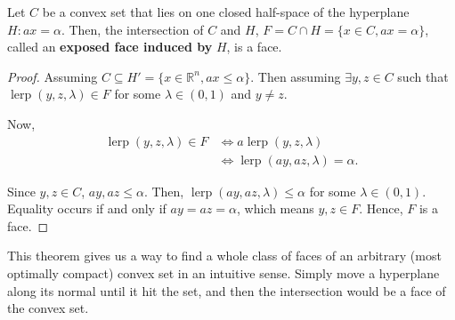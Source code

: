 \begin{theorem}
\label{thr:Exposed faces}
  Let \( C \) be a convex set that lies on one closed half-space of the
  hyperplane \( H: ax = \alpha \). Then, the intersection of \( C \) and \( H
  \), \( F = C \cap H = \{x \in C, ax = \alpha\}   \), called an \textbf{exposed
  face induced by} \( H \), is a face.
\end{theorem}

\begin{proof}
  Assuming \( C \subseteq H' = \{x \in \mathbb{R}^{n}, ax \le  \alpha\}   \).
  Then assuming \( \exists y, z \in C \) such that \( \operatorname{lerp}(y, z,
  \lambda) \in F \) for some \( \lambda \in (0, 1) \) and \( y \neq  z \).

  Now,
  \begin{align*}
    \operatorname{lerp}(y, z, \lambda) \in F &\iff a\operatorname{lerp}(y, z,
    \lambda)\\
                                             &\iff \operatorname{lerp}(ay, az,
                                             \lambda) = \alpha
  .\end{align*}
  
  Since \( y, z \in C \), \( ay, az \le \alpha \). Then, \(
  \operatorname{lerp}(ay, az, \lambda) \le \alpha \) for some \( \lambda \in (0,
  1) \). Equality occurs if and only if \( ay = az = \alpha \), which means \(
  y, z \in F \). Hence, \( F \) is a face.
\end{proof}

This theorem gives us a way to find a whole class of faces of an arbitrary
(most optimally compact) convex set in an intuitive sense. Simply move a
hyperplane along its normal until it hit the set, and then the intersection
would be a face of the convex set.

